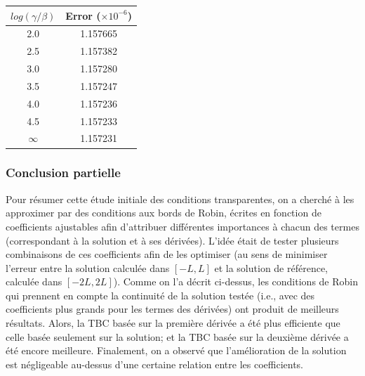 \begingroup
\begin{center}
		\begin{tabular}{c|c}
			$log(\gamma/\beta)$ & Error ($\times 10^{-6}$) \\
			\hline
			2.0 & 1.157665\\
			2.5 & 1.157382\\
			3.0 & 1.157280\\
			3.5 & 1.157247\\
			4.0 & 1.157236\\
			4.5 & 1.157233\\
			$\infty$ & 1.157231	
		\end{tabular}
\end{center}
\endgroup

\subsubsection{Conclusion partielle} 

\indent Pour résumer cette étude initiale des conditions transparentes, on a cherché à les approximer par des conditions aux bords de Robin, écrites en fonction de coefficients ajustables afin d'attribuer différentes importances à chacun des termes (correspondant à la solution et à ses dérivées). L'idée était de tester plusieurs combinaisons de ces coefficients afin de les optimiser (au sens de minimiser l'erreur entre la solution calculée dans $[-L,L]$ et la solution de référence, calculée dans $[-2L,2L]$). Comme on l'a décrit ci-dessus, les conditions de Robin qui prennent en compte la continuité de la solution testée (i.e., avec des coefficients plus grands pour les termes des dérivées) ont produit de meilleurs résultats. Alors, la TBC basée sur la première dérivée a été plus efficiente que celle basée seulement sur la solution; et la TBC basée sur la deuxième dérivée a été encore meilleure. Finalement, on a observé que l'amélioration de la solution est négligeable au-dessus d'une certaine relation entre les coefficients.
















